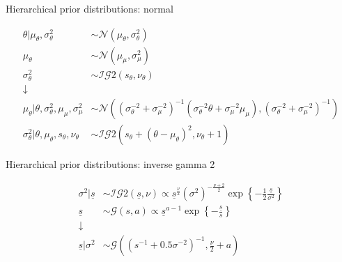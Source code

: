 \documentclass[notes,blackandwhite,mathsans,usenames,dvipsnames]{beamer}
\begin{document}
\begin{frame}{Hierarchical prior distributions: normal}

\begin{align*}
\theta|\mu_\theta,\sigma^2_\theta &\sim\mathcal{N}(\mu_\theta,\sigma^2_\theta)\\[1ex]
\mu_\theta &\sim\mathcal{N}(\mu_\mu,\sigma^2_\mu)\\
\sigma^2_\theta&\sim\mathcal{IG}2(s_\theta,\nu_\theta)\\[1ex]
\downarrow&\\[1ex]
\mu_\theta|\theta,\sigma^2_\theta,\mu_\mu,\sigma^2_\mu &\sim\mathcal{N}\left((\sigma_\theta^{-2} + \sigma_\mu^{-2})^{-1}(\sigma_\theta^{-2}\theta + \sigma_\mu^{-2}\mu_\mu)
,(\sigma_\theta^{-2} + \sigma_\mu^{-2})^{-1}\right)\\[1ex]
\sigma^2_\theta|\theta,\mu_\theta,s_\theta,\nu_\theta &\sim\mathcal{IG}2\left( s_\theta + (\theta-\mu_\theta)^2, \nu_\theta+1\right)
\end{align*}

\end{frame}


\begin{frame}{Hierarchical prior distributions: inverse gamma 2}

\begin{align*}
\sigma^2|\underline{s} &\sim\mathcal{IG}2(\underline{s},\nu)
\propto \underline{s}^{\frac{\nu}{2}}\left(\sigma^2\right)^{-\frac{\nu+2}{2}}\exp\left\{-\frac{1}{2}\frac{\underline{s}}{\sigma^2} \right\}
\\[1ex]
\underline{s}&\sim\mathcal{G}(s,a)
\propto \underline{s}^{a-1}\exp\left\{ -\frac{\underline{s}}{s}\right\}
\\[1ex]
\downarrow&\\[1ex]
\underline{s}|\sigma^2 &\sim\mathcal{G}\left( \left(s^{-1} + 0.5\sigma^{-2}\right)^{-1}, \frac{\nu}{2}+a	\right)
\end{align*}

\end{frame}
\end{document}

